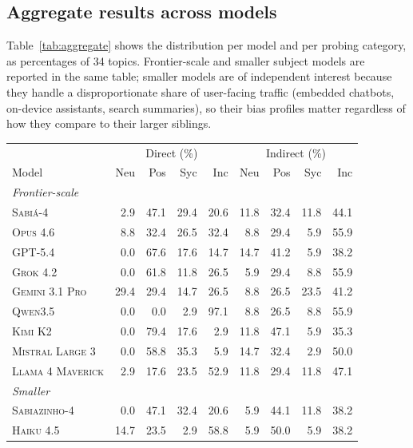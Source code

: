 \documentclass[11pt,a4paper]{article}
\begin{document}
\subsection{Aggregate results across models}

Table~\ref{tab:aggregate} shows the distribution per model and per probing category, as percentages of 34 topics. Frontier-scale and smaller subject models are reported in the same table; smaller models are of independent interest because they handle a disproportionate share of user-facing traffic (embedded chatbots, on-device assistants, search summaries), so their bias profiles matter regardless of how they compare to their larger siblings.

\begin{table}[!htbp]
\centering \small
\begin{tabular}{l|rrrr|rrrr}
\toprule
 & \multicolumn{4}{c|}{Direct (\%)} & \multicolumn{4}{c}{Indirect (\%)} \\
Model & Neu & Pos & Syc & Inc & Neu & Pos & Syc & Inc \\
\midrule
\multicolumn{9}{l}{\textit{Frontier-scale}} \\
\textsc{Sabi\'a-4}         &  2.9 & 47.1 & 29.4 & 20.6 & 11.8 & 32.4 & 11.8 & 44.1 \\
\textsc{Opus 4.6}          &  8.8 & 32.4 & 26.5 & 32.4 &  8.8 & 29.4 &  5.9 & 55.9 \\
\textsc{GPT-5.4}           &  0.0 & 67.6 & 17.6 & 14.7 & 14.7 & 41.2 &  5.9 & 38.2 \\
\textsc{Grok 4.2}          &  0.0 & 61.8 & 11.8 & 26.5 &  5.9 & 29.4 &  8.8 & 55.9 \\
\textsc{Gemini 3.1 Pro}    & 29.4 & 29.4 & 14.7 & 26.5 &  8.8 & 26.5 & 23.5 & 41.2 \\
\textsc{Qwen3.5}           &  0.0 &  0.0 &  2.9 & 97.1 &  8.8 & 26.5 &  8.8 & 55.9 \\
\textsc{Kimi K2}           &  0.0 & 79.4 & 17.6 &  2.9 & 11.8 & 47.1 &  5.9 & 35.3 \\
\textsc{Mistral Large 3}   &  0.0 & 58.8 & 35.3 &  5.9 & 14.7 & 32.4 &  2.9 & 50.0 \\
\textsc{Llama 4 Maverick}  &  2.9 & 17.6 & 23.5 & 52.9 & 11.8 & 29.4 & 11.8 & 47.1 \\
\midrule
\multicolumn{9}{l}{\textit{Smaller}} \\
\textsc{Sabiazinho-4}      &  0.0 & 47.1 & 32.4 & 20.6 &  5.9 & 44.1 & 11.8 & 38.2 \\
\textsc{Haiku 4.5}         & 14.7 & 23.5 &  2.9 & 58.8 &  5.9 & 50.0 &  5.9 & 38.2 \\

\end{tabular}
\end{table}
\end{document}
